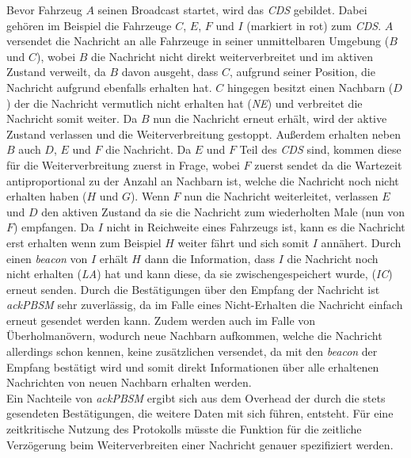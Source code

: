 \documentclass[english,runningheads,a4paper]{llncs}[2018/03/10]
\begin{document}
Bevor Fahrzeug $A$ seinen Broadcast startet, wird das \textit{CDS} gebildet.
Dabei gehören im Beispiel die Fahrzeuge $C$, $E$, $F$ und $I$ (markiert in rot) zum \textit{CDS}.
$A$ versendet die Nachricht an alle Fahrzeuge in seiner unmittelbaren Umgebung ($B$ und $C$), wobei $B$ die Nachricht nicht direkt weiterverbreitet und im aktiven Zustand verweilt, da $B$ davon ausgeht, dass $C$, aufgrund seiner Position, die Nachricht aufgrund ebenfalls erhalten hat.
$C$ hingegen besitzt einen Nachbarn ($D$) der die Nachricht vermutlich nicht erhalten hat (\textit{NE}) und verbreitet die Nachricht somit weiter.
Da $B$ nun die Nachricht erneut erhält, wird der aktive Zustand verlassen und die Weiterverbreitung gestoppt.
Außerdem erhalten neben $B$ auch $D$, $E$ und $F$ die Nachricht.
Da $E$ und $F$ Teil des \textit{CDS} sind, kommen diese für die Weiterverbreitung zuerst in Frage, wobei $F$ zuerst sendet da die Wartezeit antiproportional zu der Anzahl an Nachbarn ist, welche die Nachricht noch nicht erhalten haben ($H$ und $G$).
Wenn $F$ nun die Nachricht weiterleitet, verlassen $E$ und $D$ den aktiven Zustand da sie die Nachricht zum wiederholten Male (nun von $F$) empfangen.
Da $I$ nicht in Reichweite eines Fahrzeugs ist, kann es die Nachricht erst erhalten wenn zum Beispiel $H$ weiter fährt und sich somit $I$ annähert.
Durch einen \textit{beacon} von $I$ erhält $H$ dann die Information, dass $I$ die Nachricht noch nicht erhalten (\textit{LA}) hat und kann diese, da sie zwischengespeichert wurde, (\textit{IC}) erneut senden.
Durch die Bestätigungen über den Empfang der Nachricht ist \textit{ackPBSM} sehr zuverlässig, da im Falle eines Nicht-Erhalten die Nachricht einfach erneut gesendet werden kann.
Zudem werden auch im Falle von Überholmanövern, wodurch neue Nachbarn aufkommen, welche die Nachricht allerdings schon kennen, keine zusätzlichen versendet, da mit den \textit{beacon} der Empfang bestätigt wird und somit direkt Informationen über alle erhaltenen Nachrichten von neuen Nachbarn erhalten werden.\\
Ein Nachteile von \textit{ackPBSM} ergibt sich aus dem Overhead der durch die stets gesendeten Bestätigungen, die weitere Daten mit sich führen, entsteht.
Für eine zeitkritische Nutzung des Protokolls müsste die Funktion für die zeitliche Verzögerung beim Weiterverbreiten einer Nachricht genauer spezifiziert werden\cite{conti2013mobile}.
\end{document}
